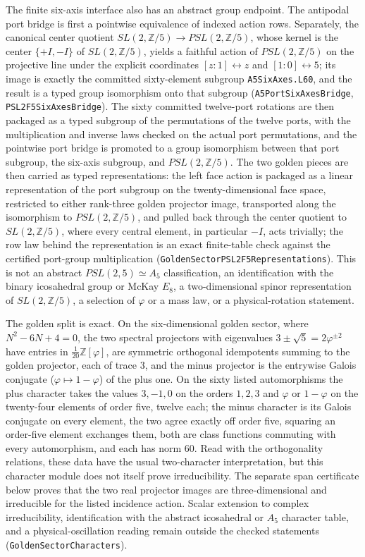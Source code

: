 \documentclass[11pt]{article}
\begin{document}
The finite six-axis interface also has an abstract group endpoint.  The
antipodal port bridge is first a pointwise equivalence of indexed action
rows.  Separately, the canonical center quotient
\(SL(2,\mathbb Z/5)\to PSL(2,\mathbb Z/5)\), whose kernel is the center
\(\{+I,-I\}\) of \(SL(2,\mathbb Z/5)\), yields a faithful action of
\(PSL(2,\mathbb Z/5)\) on the projective line under the explicit coordinates
\([z:1]\leftrightarrow z\) and \([1:0]\leftrightarrow5\); its image is exactly
the committed sixty-element subgroup \texttt{A5SixAxes.L60}, and the
result is a typed group isomorphism onto that subgroup
(\texttt{A5PortSixAxesBridge},
\texttt{PSL2F5SixAxesBridge}).  The sixty committed
twelve-port rotations are then packaged as a typed subgroup of the
permutations of the twelve ports, with the multiplication and inverse laws
checked on the actual port permutations, and the pointwise port bridge is
promoted to a group isomorphism between that port subgroup, the six-axis
subgroup, and \(PSL(2,\mathbb Z/5)\).  The two golden pieces are then
carried as typed representations: the left face action is packaged as a
linear representation of the port subgroup on the twenty-dimensional face
space, restricted to either rank-three golden projector image, transported
along the isomorphism to \(PSL(2,\mathbb Z/5)\), and pulled back through
the center quotient to \(SL(2,\mathbb Z/5)\), where every central element,
in particular \(-I\), acts trivially; the row law behind the representation
is an exact finite-table check against the certified port-group
multiplication (\texttt{GoldenSectorPSL2F5Representations}).
This is not an abstract \(PSL(2,5)\simeq A_5\) classification, an
identification with the binary icosahedral group or McKay \(E_8\), a
two-dimensional spinor representation of \(SL(2,\mathbb Z/5)\), a
selection of \(\varphi\) or a mass law, or a physical-rotation statement.

The golden split is exact. On the six-dimensional golden sector, where
\(N^2-6N+4=0\), the two spectral projectors with eigenvalues
\(3\pm\sqrt5=2\varphi^{\pm2}\) have entries in \(\tfrac1{20}\mathbb Z[\varphi]\),
are symmetric orthogonal idempotents summing to the golden projector, each
of trace \(3\), and the minus projector is the entrywise Galois conjugate
(\(\varphi\mapsto1-\varphi\)) of the plus one. On the sixty listed
automorphisms the plus character takes the values \(3,-1,0\) on the orders
\(1,2,3\) and \(\varphi\) or \(1-\varphi\) on the twenty-four elements of
order five, twelve each; the minus character is its Galois conjugate on
every element, the two agree exactly off order five, squaring an order-five
element exchanges them, both are class functions commuting with every
automorphism, and each has norm \(60\). Read with the orthogonality
relations, these data have the usual two-character interpretation, but this
character module does not itself prove irreducibility. The separate span
certificate below proves that the two real projector images are
three-dimensional and irreducible for the listed incidence action. Scalar
extension to complex irreducibility, identification with the abstract
icosahedral or \(A_5\) character table, and a physical-oscillation reading
remain outside the checked statements
(\texttt{GoldenSectorCharacters}).
\end{document}
